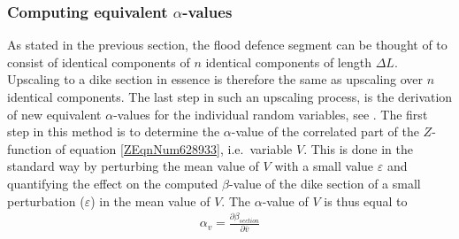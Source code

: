 {




\subsubsection{Computing equivalent $\alpha$-values}\label{Section_2.5.5.2}

As stated in the previous section, the flood defence segment can be thought of to consist of identical components of $n$ identical components of length $\Delta L$.
Upscaling to a dike section in essence is therefore the same as upscaling over $n$ identical components.
The last step in such an upscaling process, is the derivation of new equivalent $\alpha$-values for the individual random variables, see .
The first step in this method is to determine the $\alpha$-value of the correlated part of the $Z$-function of equation \eqref{ZEqnNum628933}, i.e.\ variable $V$.
This is done in the standard way by perturbing the mean value of $V$ with a small value $\varepsilon$ and quantifying the effect on the computed $\beta$-value of the dike section of a small perturbation ($\varepsilon$) in the mean value of $V$.
The $\alpha$-value of $V$ is thus equal to
\begin{align}
\alpha _{v} =\frac{\partial \beta _{section} }{\partial \bar{v}} 
\end{align}

}
